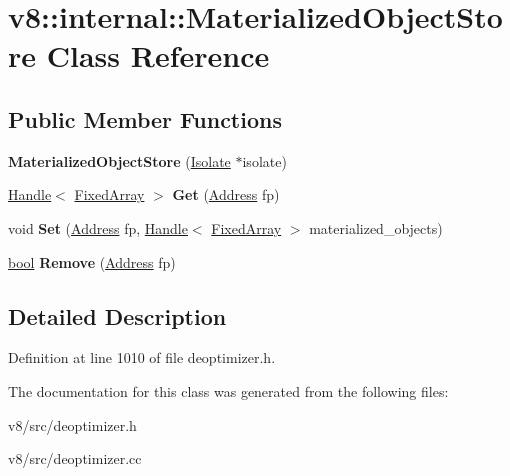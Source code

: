 \hypertarget{classv8_1_1internal_1_1MaterializedObjectStore}{}\section{v8\+:\+:internal\+:\+:Materialized\+Object\+Store Class Reference}
\label{classv8_1_1internal_1_1MaterializedObjectStore}
\subsection*{Public Member Functions}
\begin{DoxyCompactItemize}
\item 
\mbox{\label{classv8_1_1internal_1_1MaterializedObjectStore_acd26a61a51e0b3cfef28e03f99a12b62}} 
{\bfseries Materialized\+Object\+Store} (\mbox{\hyperlink{classv8_1_1internal_1_1Isolate}{Isolate}} $\ast$isolate)
\item 
\mbox{\label{classv8_1_1internal_1_1MaterializedObjectStore_aa0d2defd96ec00cdcfc6c17c7b7d3227}} 
\mbox{\hyperlink{classv8_1_1internal_1_1Handle}{Handle}}$<$ \mbox{\hyperlink{classv8_1_1internal_1_1FixedArray}{Fixed\+Array}} $>$ {\bfseries Get} (\mbox{\hyperlink{classuintptr__t}{Address}} fp)
\item 
\mbox{\label{classv8_1_1internal_1_1MaterializedObjectStore_a61f53bcfdd0d2a56191e2447a51913b6}} 
void {\bfseries Set} (\mbox{\hyperlink{classuintptr__t}{Address}} fp, \mbox{\hyperlink{classv8_1_1internal_1_1Handle}{Handle}}$<$ \mbox{\hyperlink{classv8_1_1internal_1_1FixedArray}{Fixed\+Array}} $>$ materialized\+\_\+objects)
\item 
\mbox{\label{classv8_1_1internal_1_1MaterializedObjectStore_afb9c11abbbd9d73a34036157a048c324}} 
\mbox{\hyperlink{classbool}{bool}} {\bfseries Remove} (\mbox{\hyperlink{classuintptr__t}{Address}} fp)
\end{DoxyCompactItemize}


\subsection{Detailed Description}


Definition at line 1010 of file deoptimizer.\+h.



The documentation for this class was generated from the following files\+:\begin{DoxyCompactItemize}
\item 
v8/src/deoptimizer.\+h\item 
v8/src/deoptimizer.\+cc\end{DoxyCompactItemize}
